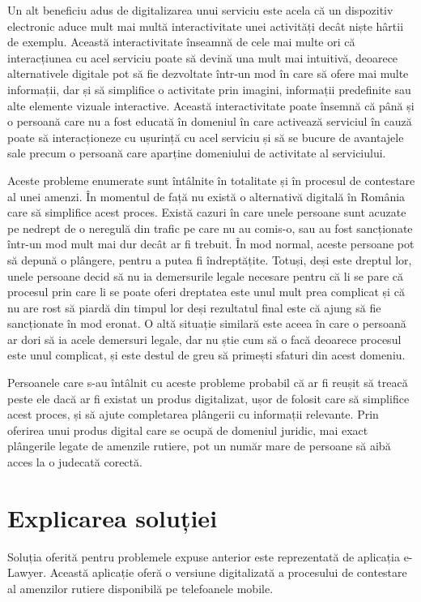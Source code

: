 \documentclass[12pt,a4paper]{report}
\theoremstyle{definition}
\theoremstyle{remark}
\begin{document}
Un alt beneficiu adus de digitalizarea unui serviciu este acela că un dispozitiv electronic aduce mult mai multă interactivitate unei activități decât niște hârtii de exemplu. Această interactivitate înseamnă de cele mai multe ori că interacțiunea cu acel serviciu poate să devină una mult mai intuitivă, deoarece alternativele digitale pot să fie dezvoltate într-un mod în care să ofere mai multe informații, dar și să simplifice o activitate prin imagini, informații predefinite sau alte elemente vizuale interactive. Această interactivitate poate însemnă că până și o persoană care nu a fost educată în domeniul în care activează serviciul în cauză poate să interacționeze cu ușurință cu acel serviciu și să se bucure de avantajele sale precum o persoană care aparține domeniului de activitate al serviciului. 

Aceste probleme enumerate sunt întâlnite în totalitate și în procesul de contestare al unei amenzi. În momentul de față nu există o alternativă digitală în România care să simplifice acest proces. Există cazuri în care unele persoane sunt acuzate pe nedrept de o neregulă din trafic pe care nu au comis-o, sau au fost sancționate într-un mod mult mai dur decât ar fi trebuit. În mod normal, aceste persoane pot să depună o plângere, pentru a putea fi îndreptățite. Totuși, deși este dreptul lor, unele persoane decid să nu ia demersurile legale necesare pentru că li se pare că procesul prin care li se poate oferi dreptatea este unul mult prea complicat și că nu are rost să piardă din timpul lor deși rezultatul final este că ajung să fie sancționate în mod eronat. O altă situație similară este aceea în care o persoană ar dori să ia acele demersuri legale, dar nu știe cum să o facă deoarece procesul este unul complicat, și este destul de greu să primești sfaturi din acest domeniu. 

Persoanele care s-au întâlnit cu aceste probleme probabil că ar fi reușit să treacă peste ele dacă ar fi existat un produs digitalizat, ușor de folosit care să simplifice acest proces, și să ajute completarea plângerii cu informații relevante. Prin oferirea unui produs digital care se ocupă de domeniul juridic, mai exact plângerile legate de amenzile rutiere, pot un număr mare de persoane să aibă acces la o judecată corectă.
\newpage
\section{Explicarea soluției}
\vspace{20pt}
Soluția oferită pentru problemele expuse anterior este reprezentată de aplicația e-Lawyer. Această aplicație oferă o versiune digitalizată a procesului de contestare al amenzilor rutiere disponibilă pe telefoanele mobile. 
\end{document}
